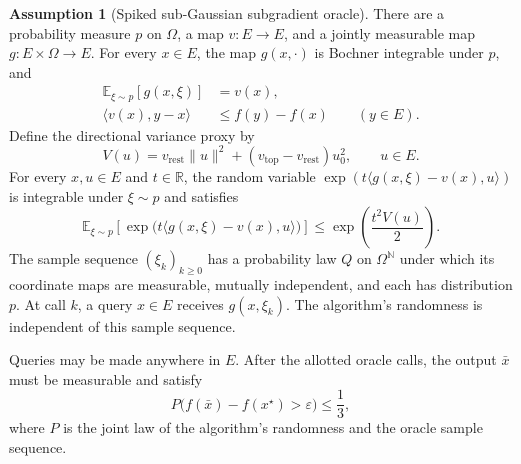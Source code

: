 \documentclass[10pt]{article}
\theoremstyle{definition}
\newtheorem{assumption}{Assumption}
\begin{document}
\begin{assumption}[Spiked sub-Gaussian subgradient oracle]
There are a probability measure $p$ on $\Omega$, a map $v:E\to E$, and a jointly measurable map $g:E\times\Omega\to E$. For every $x\in E$, the map $g(x,\cdot)$ is Bochner integrable under $p$, and
\[
\begin{aligned}
\mathbb{E}_{\xi\sim p}[g(x,\xi)]&=v(x),\\
\langle v(x),y-x\rangle&\leq f(y)-f(x)
\qquad (y\in E).
\end{aligned}
\]
Define the directional variance proxy by
\[
V(u)=v_{\mathrm{rest}}\|u\|^2
 +(v_{\mathrm{top}}-v_{\mathrm{rest}})u_0^2,
\qquad u\in E.
\]
For every $x,u\in E$ and $t\in\mathbb{R}$, the random variable $\exp(t\langle g(x,\xi)-v(x),u\rangle)$ is integrable under $\xi\sim p$ and satisfies
\[
\mathbb{E}_{\xi\sim p}\!\left[
\exp\bigl(t\langle g(x,\xi)-v(x),u\rangle\bigr)
\right]
\leq \exp\left(\frac{t^2V(u)}{2}\right).
\]
The sample sequence $(\xi_k)_{k\geq0}$ has a probability law $Q$ on $\Omega^{\mathbb{N}}$ under which its coordinate maps are measurable, mutually independent, and each has distribution $p$. At call $k$, a query $x\in E$ receives $g(x,\xi_k)$. The algorithm's randomness is independent of this sample sequence.
\end{assumption}

Queries may be made anywhere in $E$. After the allotted oracle calls, the output $\bar{x}$ must be measurable and satisfy
\[
P\bigl(f(\bar{x})-f(x^\star)>\varepsilon\bigr)\leq\frac13,
\]
where $P$ is the joint law of the algorithm's randomness and the oracle sample sequence.
\end{document}
